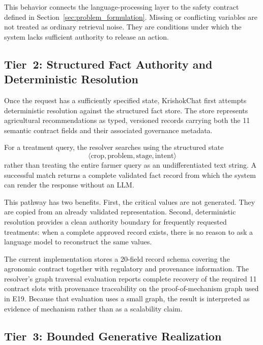 \documentclass[a4paper,fleqn]{cas-dc}
\begin{document}
This behavior connects the language-processing layer to the safety contract defined in Section~\ref{sec:problem_formulation}. Missing or conflicting variables are not treated as ordinary retrieval noise. They are conditions under which the system lacks sufficient authority to release an action.

\subsection{Tier~2: Structured Fact Authority and Deterministic Resolution}

Once the request has a sufficiently specified state, KrishokChat first attempts deterministic resolution against the structured fact store. The store represents agricultural recommendations as typed, versioned records carrying both the 11 semantic contract fields and their associated governance metadata.

For a treatment query, the resolver searches using the structured state
\begin{equation}
\langle \mathrm{crop},\mathrm{problem},\mathrm{stage},\mathrm{intent}\rangle
\end{equation}
rather than treating the entire farmer query as an undifferentiated text string. A successful match returns a complete validated fact record from which the system can render the response without an LLM.

This pathway has two benefits. First, the critical values are not generated. They are copied from an already validated representation. Second, deterministic resolution provides a clean authority boundary for frequently requested treatments: when a complete approved record exists, there is no reason to ask a language model to reconstruct the same values.

The current implementation stores a 20-field record schema covering the agronomic contract together with regulatory and provenance information. The resolver's graph traversal evaluation reports complete recovery of the required 11 contract slots with provenance traceability on the proof-of-mechanism graph used in E19. Because that evaluation uses a small graph, the result is interpreted as evidence of mechanism rather than as a scalability claim.

\subsection{Tier~3: Bounded Generative Realization}
\end{document}
